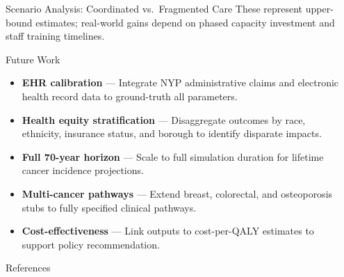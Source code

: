 \documentclass[final]{beamer}
\newlength{\sepwidth}
\newlength{\colwidth}
\newcommand{\separatorcolumn}{\begin{column}{\sepwidth}\end{column}}
\begin{document}
\begin{frame}[t]
\begin{columns}[t]
\begin{column}{\colwidth}
\begin{block}{Scenario Analysis: Coordinated vs.\ Fragmented Care}
    These represent upper-bound estimates; real-world gains depend on
    phased capacity investment and staff training timelines.

  \end{block}

  \begin{block}{Future Work}

    \begin{itemize}
      \item \textbf{EHR calibration} — Integrate NYP administrative claims
            and electronic health record data to ground-truth all parameters.
      \item \textbf{Health equity stratification} — Disaggregate outcomes
            by race, ethnicity, insurance status, and borough to identify
            disparate impacts.
      \item \textbf{Full 70-year horizon} — Scale to full simulation
            duration for lifetime cancer incidence projections.
      \item \textbf{Multi-cancer pathways} — Extend breast, colorectal,
            and osteoporosis stubs to fully specified clinical pathways.
      \item \textbf{Cost-effectiveness} — Link outputs to cost-per-QALY
            estimates to support policy recommendation.
    \end{itemize}

  \end{block}

  \begin{block}{References}

    \nocite{*}
    \footnotesize{}

  \end{block}

\end{column}

\separatorcolumn
\end{columns}
\end{frame}
\end{document}
